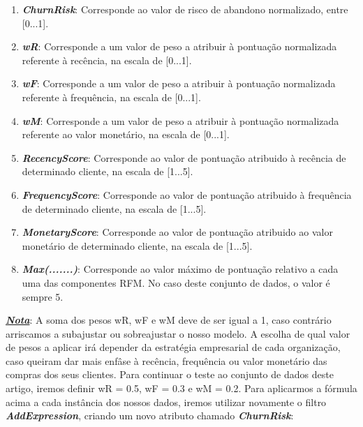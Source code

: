 \documentclass{easychair}
\begin{document}
\begin{enumerate}
	\item[\textbullet] \textit{\textbf{ChurnRisk}}: Corresponde ao valor de risco de abandono normalizado, entre [0...1].
	\item[\textbullet] \textit{\textbf{wR}}: Corresponde a um valor de peso a atribuir à pontuação normalizada referente à recência, na escala de [0...1].
	\item[\textbullet] \textit{\textbf{wF}}: Corresponde a um valor de peso a atribuir à pontuação normalizada referente à frequência, na escala de [0...1].
	\item[\textbullet] \textit{\textbf{wM}}: Corresponde a um valor de peso a atribuir à pontuação normalizada referente ao valor monetário, na escala de [0...1].
	\item[\textbullet] \textit{\textbf{RecencyScore}}: Corresponde ao valor de pontuação atribuido à recência de determinado cliente, na escala de [1...5].
	\item[\textbullet] \textit{\textbf{FrequencyScore}}: Corresponde ao valor de pontuação atribuido à frequência de determinado cliente, na escala de [1...5].
	\item[\textbullet] \textit{\textbf{MonetaryScore}}: Corresponde ao valor de pontuação atribuido ao valor monetário de determinado cliente, na escala de [1...5].
	\item[\textbullet] \textit{\textbf{Max(.......)}}: Corresponde ao valor máximo de pontuação relativo a cada uma das componentes RFM. No caso deste conjunto de dados, o valor é sempre 5.
\end{enumerate}

\textit{\textbf{\underline{Nota}}}: A soma dos pesos wR, wF e wM deve de ser igual a 1, caso contrário arriscamos a subajustar ou sobreajustar o nosso modelo. A escolha de qual valor de pesos a aplicar irá depender da estratégia empresarial de cada organização, caso queiram dar mais enfâse à recência, frequência ou valor monetário das compras dos seus clientes. Para continuar o teste ao conjunto de dados deste artigo, iremos definir wR = 0.5, wF = 0.3 e wM = 0.2.
Para aplicarmos a fórmula acima a cada instância dos nossos dados, iremos utilizar novamente o filtro \textit{\textbf{AddExpression}}, criando um novo atributo chamado \textit{\textbf{ChurnRisk}}:
\end{document}
